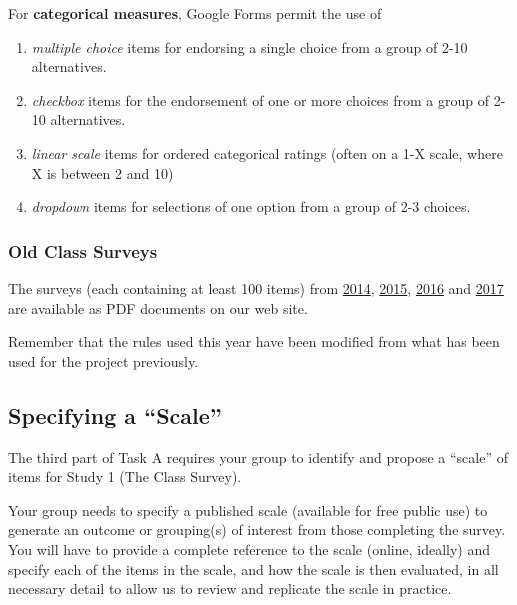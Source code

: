 \documentclass[]{book}
\providecommand{\tightlist}{%
  \setlength{\itemsep}{0pt}\setlength{\parskip}{0pt}}
\theoremstyle{definition}
\theoremstyle{definition}
\theoremstyle{definition}
\theoremstyle{remark}
\begin{document}
For \textbf{categorical measures}, Google Forms permit the use of

\begin{enumerate}
\def\labelenumi{\arabic{enumi}.}
\tightlist
\item
  \emph{multiple choice} items for endorsing a single choice from a
  group of 2-10 alternatives.
\item
  \emph{checkbox} items for the endorsement of one or more choices from
  a group of 2-10 alternatives.
\item
  \emph{linear scale} items for ordered categorical ratings (often on a
  1-X scale, where X is between 2 and 10)
\item
  \emph{dropdown} items for selections of one option from a group of 2-3
  choices.
\end{enumerate}

\hypertarget{old-class-surveys}{%
\subsubsection{Old Class Surveys}\label{old-class-surveys}}

The surveys (each containing at least 100 items) from
\href{https://github.com/THOMASELOVE/431-2018-project/blob/master/oldsurveys/2014_431_class_survey.pdf}{2014},
\href{https://github.com/THOMASELOVE/431-2018-project/blob/master/oldsurveys/2015_431_class_survey.pdf}{2015},
\href{https://github.com/THOMASELOVE/431-2018-project/blob/master/oldsurveys/2016_431_class_survey.pdf}{2016}
and
\href{https://github.com/THOMASELOVE/431-2018-project/blob/master/oldsurveys/2017_431_class_survey.pdf}{2017}
are available as PDF documents on our web site.

Remember that the rules used this year have been modified from what has
been used for the project previously.

\hypertarget{specifying-a-scale}{%
\subsection{Specifying a ``Scale''}\label{specifying-a-scale}}

The third part of Task A requires your group to identify and propose a
``scale'' of items for Study 1 (The Class Survey).

Your group needs to specify a published scale (available for free public
use) to generate an outcome or grouping(s) of interest from those
completing the survey. You will have to provide a complete reference to
the scale (online, ideally) and specify each of the items in the scale,
and how the scale is then evaluated, in all necessary detail to allow us
to review and replicate the scale in practice.
\end{document}
